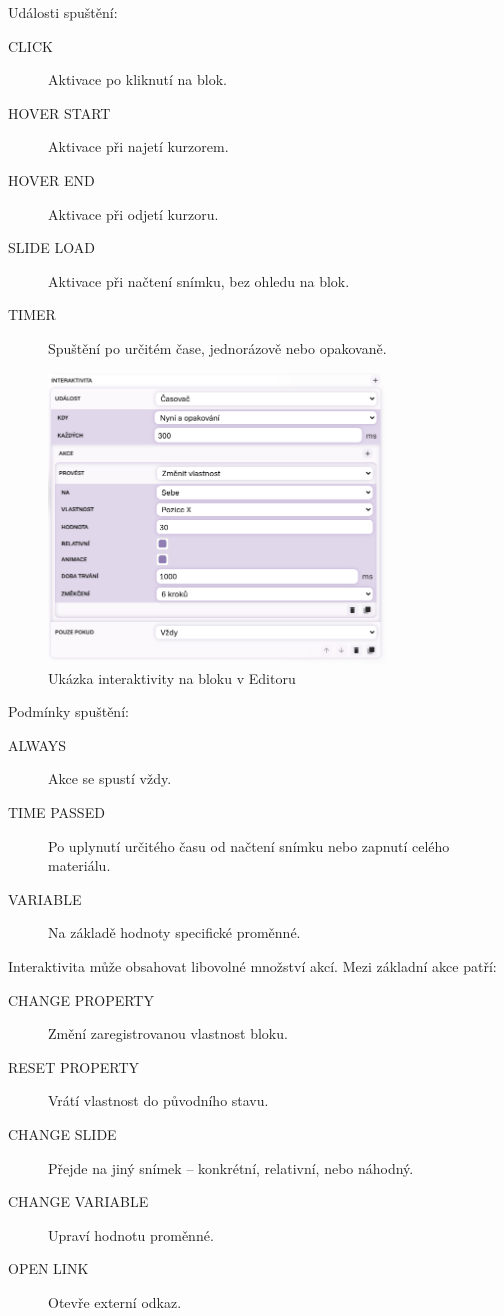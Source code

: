 Události spuštění:
\begin{description}
  \item[CLICK] Aktivace po kliknutí na blok.
  \item[HOVER START] Aktivace při najetí kurzorem.
  \item[HOVER END] Aktivace při odjetí kurzoru.
  \item[SLIDE LOAD] Aktivace při načtení snímku, bez ohledu na blok.
  \item[TIMER] Spuštění po určitém čase, jednorázově nebo opakovaně.
\end{description}


\begin{figure}[ht!]
    \centering
    \includegraphics[width=0.8\textwidth]{media/05_realizace/interaktivita.png}
    \caption{Ukázka interaktivity na bloku v Editoru}
    \label{fig:interaktivita}
\end{figure}


Podmínky spuštění:
\begin{description}
  \item[ALWAYS] Akce se spustí vždy.
  \item[TIME PASSED] Po uplynutí určitého času od načtení snímku nebo zapnutí celého materiálu.
  \item[VARIABLE] Na základě hodnoty specifické proměnné.
\end{description}

Interaktivita může obsahovat libovolné množství akcí. Mezi základní akce patří:

\begin{description}
  \item[CHANGE PROPERTY] Změní zaregistrovanou vlastnost bloku.
  \item[RESET PROPERTY] Vrátí vlastnost do původního stavu.
  \item[CHANGE SLIDE] Přejde na jiný snímek – konkrétní, relativní, nebo náhodný.
  \item[CHANGE VARIABLE] Upraví hodnotu proměnné.
  \item[OPEN LINK] Otevře externí odkaz.
\end{description}

